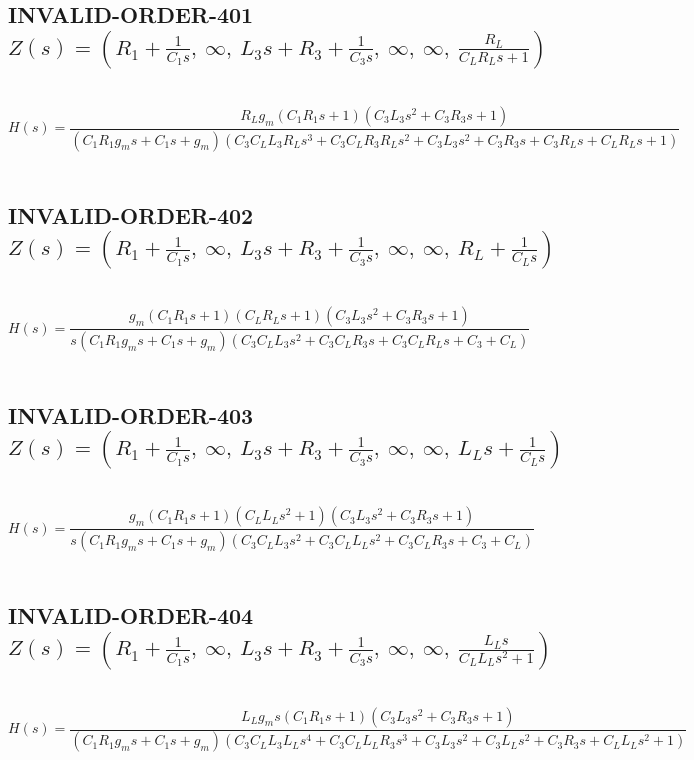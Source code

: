 \documentclass{article}
\begin{document}
\subsection{INVALID-ORDER-401 $Z(s) = \left( R_{1} + \frac{1}{C_{1} s}, \  \infty, \  L_{3} s + R_{3} + \frac{1}{C_{3} s}, \  \infty, \  \infty, \  \frac{R_{L}}{C_{L} R_{L} s + 1}\right)$ } \ 
\textbf{\[H(s) = \frac{R_{L} g_{m} \left(C_{1} R_{1} s + 1\right) \left(C_{3} L_{3} s^{2} + C_{3} R_{3} s + 1\right)}{\left(C_{1} R_{1} g_{m} s + C_{1} s + g_{m}\right) \left(C_{3} C_{L} L_{3} R_{L} s^{3} + C_{3} C_{L} R_{3} R_{L} s^{2} + C_{3} L_{3} s^{2} + C_{3} R_{3} s + C_{3} R_{L} s + C_{L} R_{L} s + 1\right)}\] } \ 
\subsection{INVALID-ORDER-402 $Z(s) = \left( R_{1} + \frac{1}{C_{1} s}, \  \infty, \  L_{3} s + R_{3} + \frac{1}{C_{3} s}, \  \infty, \  \infty, \  R_{L} + \frac{1}{C_{L} s}\right)$ } \ 
\textbf{\[H(s) = \frac{g_{m} \left(C_{1} R_{1} s + 1\right) \left(C_{L} R_{L} s + 1\right) \left(C_{3} L_{3} s^{2} + C_{3} R_{3} s + 1\right)}{s \left(C_{1} R_{1} g_{m} s + C_{1} s + g_{m}\right) \left(C_{3} C_{L} L_{3} s^{2} + C_{3} C_{L} R_{3} s + C_{3} C_{L} R_{L} s + C_{3} + C_{L}\right)}\] } \ 
\subsection{INVALID-ORDER-403 $Z(s) = \left( R_{1} + \frac{1}{C_{1} s}, \  \infty, \  L_{3} s + R_{3} + \frac{1}{C_{3} s}, \  \infty, \  \infty, \  L_{L} s + \frac{1}{C_{L} s}\right)$ } \ 
\textbf{\[H(s) = \frac{g_{m} \left(C_{1} R_{1} s + 1\right) \left(C_{L} L_{L} s^{2} + 1\right) \left(C_{3} L_{3} s^{2} + C_{3} R_{3} s + 1\right)}{s \left(C_{1} R_{1} g_{m} s + C_{1} s + g_{m}\right) \left(C_{3} C_{L} L_{3} s^{2} + C_{3} C_{L} L_{L} s^{2} + C_{3} C_{L} R_{3} s + C_{3} + C_{L}\right)}\] } \ 
\subsection{INVALID-ORDER-404 $Z(s) = \left( R_{1} + \frac{1}{C_{1} s}, \  \infty, \  L_{3} s + R_{3} + \frac{1}{C_{3} s}, \  \infty, \  \infty, \  \frac{L_{L} s}{C_{L} L_{L} s^{2} + 1}\right)$ } \ 
\textbf{\[H(s) = \frac{L_{L} g_{m} s \left(C_{1} R_{1} s + 1\right) \left(C_{3} L_{3} s^{2} + C_{3} R_{3} s + 1\right)}{\left(C_{1} R_{1} g_{m} s + C_{1} s + g_{m}\right) \left(C_{3} C_{L} L_{3} L_{L} s^{4} + C_{3} C_{L} L_{L} R_{3} s^{3} + C_{3} L_{3} s^{2} + C_{3} L_{L} s^{2} + C_{3} R_{3} s + C_{L} L_{L} s^{2} + 1\right)}\] } \ 
\end{document}
